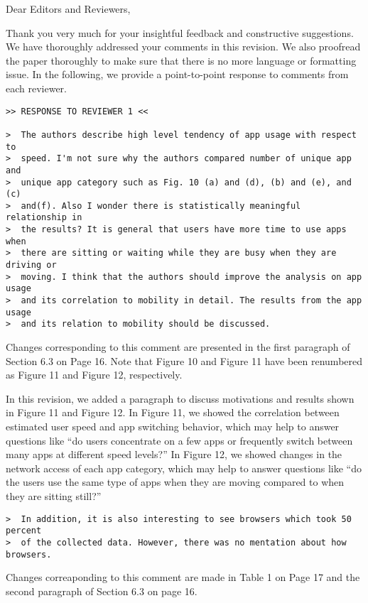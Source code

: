 \noindent Dear Editors and Reviewers,
\bigskip

Thank you very much for your insightful feedback and constructive suggestions. We have thoroughly addressed your comments %
in this revision. %
We also proofread the paper thoroughly to make sure that there is no more language or formatting issue. 
In the following, we provide a point-to-point response to comments from each reviewer.

\bigskip
\begin{verbatim}
>> RESPONSE TO REVIEWER 1 <<

>  The authors describe high level tendency of app usage with respect to
>  speed. I'm not sure why the authors compared number of unique app and
>  unique app category such as Fig. 10 (a) and (d), (b) and (e), and (c)
>  and(f). Also I wonder there is statistically meaningful relationship in
>  the results? It is general that users have more time to use apps when
>  there are sitting or waiting while they are busy when they are driving or
>  moving. I think that the authors should improve the analysis on app usage
>  and its correlation to mobility in detail. The results from the app usage
>  and its relation to mobility should be discussed. 
\end{verbatim}

Changes corresponding to this comment are presented in the first paragraph of Section 6.3 on Page 16. 
Note that Figure 10 and Figure 11 have been renumbered as Figure 11 and Figure 12, respectively.

In this revision, we added a paragraph to discuss motivations and results shown in Figure 11 and Figure 12. 
In Figure 11, we showed the correlation between estimated user speed and app switching behavior, 
which may help to answer questions like ``do users concentrate on a few apps or frequently switch between many apps at different speed levels?'' 
In Figure 12, we showed changes in the network access of each app category, 
which may help to answer questions like ``do the users use the same type of apps when they are moving compared to when they are sitting still?''

\begin{verbatim}
>  In addition, it is also interesting to see browsers which took 50 percent 
>  of the collected data. However, there was no mentation about how browsers.
\end{verbatim}

Changes correaponding to this comment are made in Table 1 on Page 17 
and the second paragraph of Section 6.3 on page 16.


